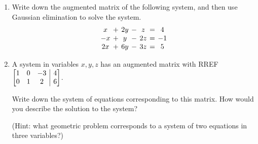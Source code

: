 \documentclass[12pt]{article}
\makeatletter
\newenvironment{amatrix}[1]{%
  \left[\begin{array}{@{}*{#1}{c}|c@{}}
}{%
  \end{array}\right]
}
\newcommand{\di}{\displaystyle}
\newcommand{\bam}{\begin{amatrix}}
\newcommand{\eam}{\end{amatrix}}
\makeatother
\begin{document}
\begin{enumerate}
\pagebreak

\item Write down the augmented matrix of the following system, and then use Gaussian elimination to solve the system.
\[
 \arraycolsep=2pt \begin{array}{ccccccc}
                  x&+&2y&-&z&=&4\\-x&+&y&-&2z&=&-1\\ 2x&+&6y&-&3z&=&5
                  \end{array}
\]

\vspace{4in}

\item A system in variables $x,y,z$ has an augmented matrix with RREF $\di \bam{3} 1&0&-3&4\\0&1&2&6\eam$.

Write down the system of equations corresponding to this matrix. How would you describe the solution to the system?

(Hint: what geometric problem corresponds to a system of two equations in three variables?)

 \end{enumerate}
  
\end{document}
